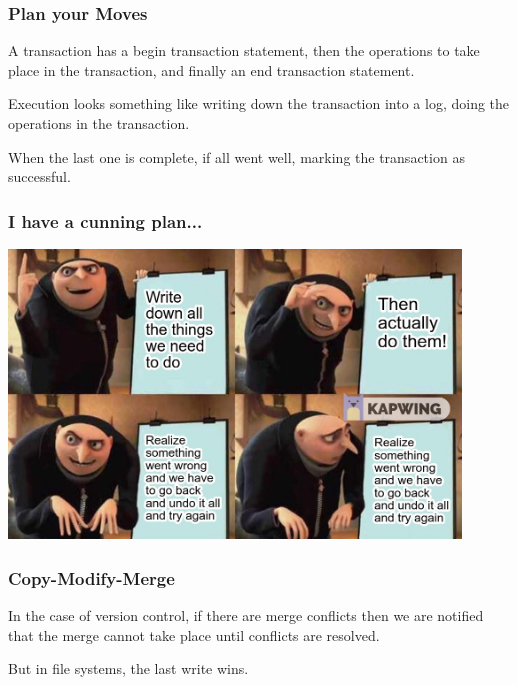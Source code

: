 \begin{frame}
	\frametitle{Plan your Moves}

	A transaction has a begin transaction statement, then the operations to take place in the transaction, and finally an end transaction statement.

	Execution looks something like writing down the transaction into a log, doing the operations in the transaction.

	When the last one is complete, if all went well, marking the transaction as successful.

\end{frame}


\begin{frame}
	\frametitle{I have a cunning plan...}

	\begin{center}
		\includegraphics[width=0.9\textwidth]{images/gru-plan.jpg}
	\end{center}

\end{frame}



\begin{frame}
	\frametitle{Copy-Modify-Merge}

	In the case of version control, if there are merge conflicts then we are notified that the merge cannot take place until conflicts are resolved.

	But in file systems, the last write wins.

\end{frame}


